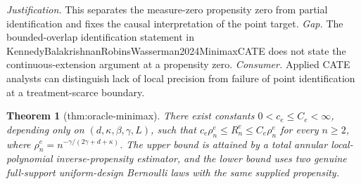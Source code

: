 \documentclass{article}
\newtheorem{theorem}{Theorem}
\begin{document}
\par\smallskip\noindent \textit{Justification.} This separates the measure-zero propensity zero from partial identification and fixes the causal interpretation of the point target. \textit{Gap.} The bounded-overlap identification statement in KennedyBalakrishnanRobinsWasserman2024MinimaxCATE does not state the continuous-extension argument at a propensity zero. \textit{Consumer.} Applied CATE analysts can distinguish lack of local precision from failure of point identification at a treatment-scarce boundary.

\begin{theorem}[thm:oracle-minimax]\label{thm:oracle-minimax}
There exist constants \(0<c_e\le C_e<\infty\), depending only on \((d,\kappa,\beta,\gamma,L)\), such that \(c_e\rho_n^e\le R_n^e\le C_e\rho_n^e\) for every \(n\ge2\), where \(\rho_n^e=n^{-\gamma/(2\gamma+d+\kappa)}\). The upper bound is attained by a total annular local-polynomial inverse-propensity estimator, and the lower bound uses two genuine full-support uniform-design Bernoulli laws with the same supplied propensity.
\end{theorem}
\end{document}
